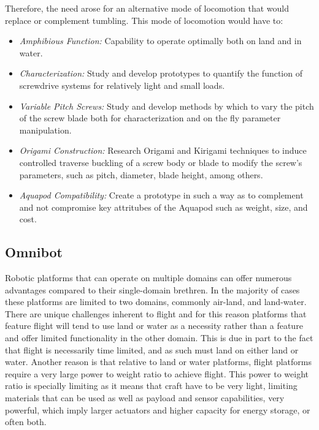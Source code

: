 Therefore, the need arose for an alternative mode of locomotion that would replace or complement tumbling. This mode of locomotion would have to:

\begin{itemize}
	\item \emph{Amphibious Function:} Capability to operate optimally both on land and in water. 
	\item \emph{Characterization:} Study and develop prototypes to quantify the function of screwdrive systems for relatively light and small loads. 
	\item \emph{Variable Pitch Screws:} Study and develop methods by which to vary the pitch of the screw blade both for characterization and on the fly parameter manipulation.
	\item \emph{Origami Construction:} Research Origami and Kirigami techniques to induce controlled traverse buckling of a screw body or blade to modify the screw's parameters, such as pitch, diameter, blade height, among others. 
	\item \emph{Aquapod Compatibility:} Create a prototype in such a way as to complement and not compromise key attritubes of the Aquapod such as weight, size, and cost. 
\end{itemize}
	

\subsection{Omnibot}

Robotic platforms that can operate on multiple domains can offer numerous advantages compared to their single-domain brethren. In the majority of cases these platforms are limited to two domains, commonly air-land, and land-water. There are unique challenges inherent to flight and for this reason platforms that feature flight will tend to use land or water as a necessity rather than a feature and offer limited functionality in the other domain. This is due in part to the fact that flight is necessarily time limited, and as such must land on either land or water. Another reason is that relative to land or water platforms, flight platforms require a very large power to weight ratio to achieve flight. This power to weight ratio is specially limiting as it means that craft have to be very light, limiting materials that can be used as well as payload and sensor capabilities, very powerful, which imply larger actuators and higher capacity for energy storage, or often both. 

